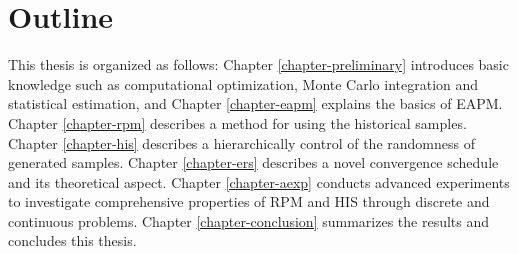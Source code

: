  
\section{Outline}
This thesis is organized as follows:
Chapter \ref{chapter-preliminary} introduces basic knowledge such as computational optimization,
Monte Carlo integration and statistical estimation,
and 
Chapter \ref{chapter-eapm} explains the basics of EAPM.
Chapter \ref{chapter-rpm} describes a method for using the historical samples.
Chapter \ref{chapter-his} describes a hierarchically control of the randomness of generated samples.
Chapter \ref{chapter-ers} describes a novel convergence schedule and its
theoretical aspect.
Chapter \ref{chapter-aexp} conducts advanced experiments to investigate
comprehensive properties of RPM and HIS through discrete and continuous 
problems.
Chapter \ref{chapter-conclusion} summarizes the results and concludes this thesis.
